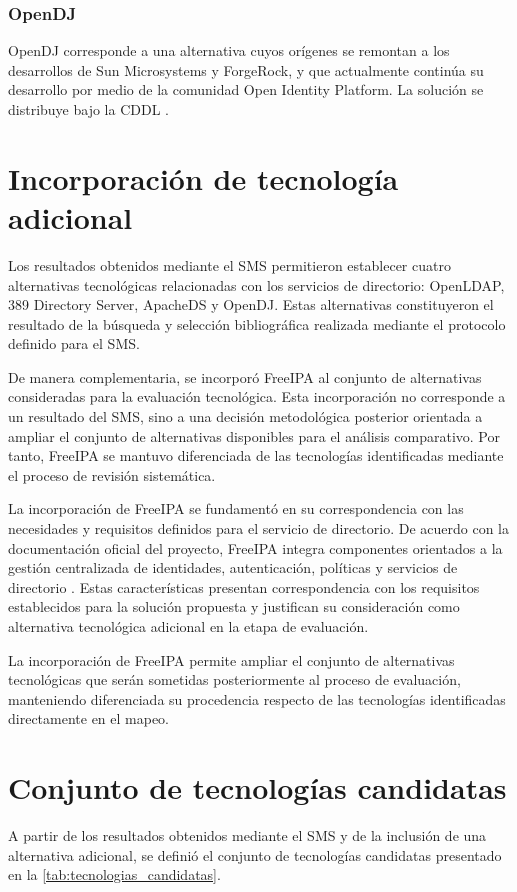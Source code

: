 \subsubsection{OpenDJ}

OpenDJ corresponde a una alternativa cuyos orígenes se remontan a los desarrollos de Sun Microsystems y ForgeRock, y que actualmente continúa su desarrollo por medio de la comunidad Open Identity Platform. La solución se distribuye bajo la \ac{CDDL} \citep{OpenDJ2026}.

\section{Incorporación de tecnología adicional}\label{sec:incorporacion-tecnologia-adicional}

Los resultados obtenidos mediante el \ac{SMS} permitieron establecer cuatro alternativas tecnológicas relacionadas con los servicios de directorio: OpenLDAP, 389 Directory Server, ApacheDS y OpenDJ. Estas alternativas constituyeron el resultado de la búsqueda y selección bibliográfica realizada mediante el protocolo definido para el SMS.

De manera complementaria, se incorporó FreeIPA al conjunto de alternativas consideradas para la evaluación tecnológica. Esta incorporación no corresponde a un resultado del SMS, sino a una decisión metodológica posterior orientada a ampliar el conjunto de alternativas disponibles para el análisis comparativo. Por tanto, FreeIPA se mantuvo diferenciada de las tecnologías identificadas mediante el proceso de revisión sistemática.

La incorporación de FreeIPA se fundamentó en su correspondencia con las necesidades y requisitos definidos para el servicio de directorio. De acuerdo con la documentación oficial del proyecto, FreeIPA integra componentes orientados a la gestión centralizada de identidades, autenticación, políticas y servicios de directorio \citep{FreeIPA2026}. Estas características presentan correspondencia con los requisitos establecidos para la solución propuesta y justifican su consideración como alternativa tecnológica adicional en la etapa de evaluación.

La incorporación de FreeIPA permite ampliar el conjunto de alternativas tecnológicas que serán sometidas posteriormente al proceso de evaluación, manteniendo diferenciada su procedencia respecto de las tecnologías identificadas directamente en el mapeo.

\section{Conjunto de tecnologías candidatas}\label{sec:conjunto-tecnologias-candidatas}

A partir de los resultados obtenidos mediante el \ac{SMS} y de la inclusión de una alternativa adicional, se definió el conjunto de tecnologías candidatas presentado en la \autoref{tab:tecnologias_candidatas}.


